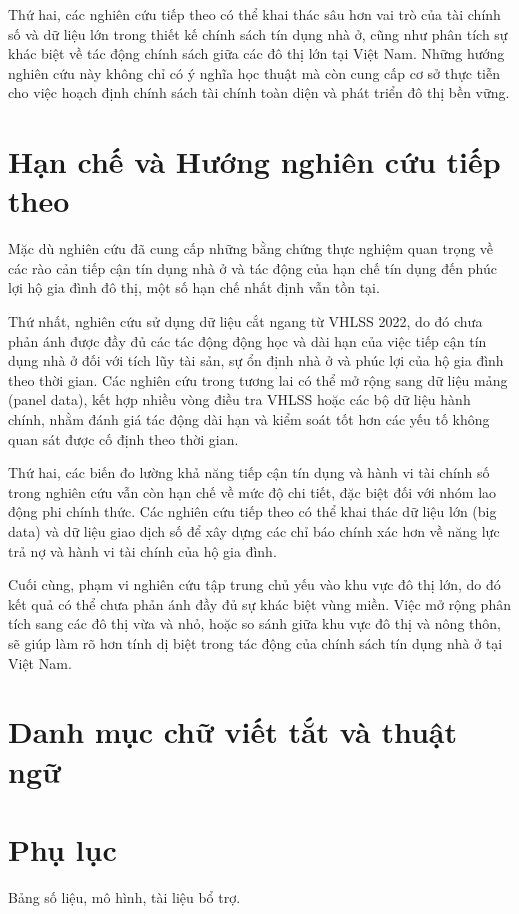 \documentclass[12pt,a4paper]{report}
\begin{document}
	Thứ hai, các nghiên cứu tiếp theo có thể khai thác sâu hơn vai trò của tài chính số và dữ liệu lớn trong thiết kế chính sách tín dụng nhà ở, cũng như phân tích sự khác biệt về tác động chính sách giữa các đô thị lớn tại Việt Nam. Những hướng nghiên cứu này không chỉ có ý nghĩa học thuật mà còn cung cấp cơ sở thực tiễn cho việc hoạch định chính sách tài chính toàn diện và phát triển đô thị bền vững.
	
	
	\section{Hạn chế và Hướng nghiên cứu tiếp theo}
	
	Mặc dù nghiên cứu đã cung cấp những bằng chứng thực nghiệm quan trọng về các rào cản tiếp cận tín dụng nhà ở và tác động của hạn chế tín dụng đến phúc lợi hộ gia đình đô thị, một số hạn chế nhất định vẫn tồn tại.
	
	Thứ nhất, nghiên cứu sử dụng dữ liệu cắt ngang từ VHLSS 2022, do đó chưa phản ánh được đầy đủ các tác động động học và dài hạn của việc tiếp cận tín dụng nhà ở đối với tích lũy tài sản, sự ổn định nhà ở và phúc lợi của hộ gia đình theo thời gian. Các nghiên cứu trong tương lai có thể mở rộng sang dữ liệu mảng (panel data), kết hợp nhiều vòng điều tra VHLSS hoặc các bộ dữ liệu hành chính, nhằm đánh giá tác động dài hạn và kiểm soát tốt hơn các yếu tố không quan sát được cố định theo thời gian.
	
	Thứ hai, các biến đo lường khả năng tiếp cận tín dụng và hành vi tài chính số trong nghiên cứu vẫn còn hạn chế về mức độ chi tiết, đặc biệt đối với nhóm lao động phi chính thức. Các nghiên cứu tiếp theo có thể khai thác dữ liệu lớn (big data) và dữ liệu giao dịch số để xây dựng các chỉ báo chính xác hơn về năng lực trả nợ và hành vi tài chính của hộ gia đình.
	
	Cuối cùng, phạm vi nghiên cứu tập trung chủ yếu vào khu vực đô thị lớn, do đó kết quả có thể chưa phản ánh đầy đủ sự khác biệt vùng miền. Việc mở rộng phân tích sang các đô thị vừa và nhỏ, hoặc so sánh giữa khu vực đô thị và nông thôn, sẽ giúp làm rõ hơn tính dị biệt trong tác động của chính sách tín dụng nhà ở tại Việt Nam.
	
	\newpage
	\printbibliography
	\newpage
	\section{Danh mục chữ viết tắt và thuật ngữ}
	\newpage
	\appendix
	\section{Phụ lục}
	Bảng số liệu, mô hình, tài liệu bổ trợ.
	
\end{document}

